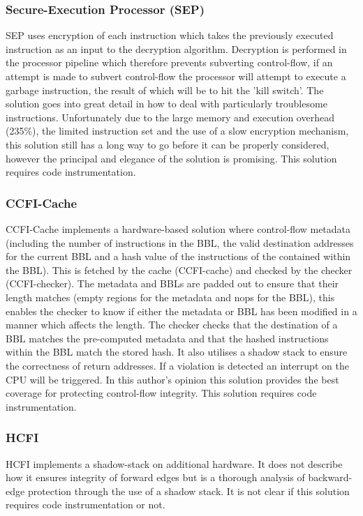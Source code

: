 \subsubsection{Secure-Execution Processor (SEP)}
SEP \cite{Lee2019} uses encryption of each instruction which takes the previously executed instruction as an input to the decryption algorithm. Decryption is performed in the processor pipeline which therefore prevents subverting control-flow, if an attempt is made to subvert control-flow the processor will attempt to execute a garbage instruction, the result of which will be to hit the 'kill switch'. The solution goes into great detail in how to deal with particularly troublesome instructions. Unfortunately due to the large memory and execution overhead (235\%), the limited instruction set and the use of a slow encryption mechanism, this solution still has a long way to go before it can be properly considered, however the principal and elegance of the solution is promising. This solution requires code instrumentation.

\subsubsection{CCFI-Cache}
CCFI-Cache \cite{Danger2018} implements a hardware-based solution where control-flow metadata (including the number of instructions in the BBL, the valid destination addresses for the current BBL and a hash value of the instructions of the contained within the BBL). This is fetched by the cache (CCFI-cache) and checked by the checker (CCFI-checker). The metadata and BBLs are padded out to ensure that their length matches (empty regions for the metadata and nops for the BBL), this enables the checker to know if either the metadata or BBL has been modified in a manner which affects the length. The checker checks that the destination of a BBL matches the pre-computed metadata and that the hashed instructions within the BBL match the stored hash. It also utilises a shadow stack to ensure the correctness of return addresses. If a violation is detected an interrupt on the CPU will be triggered. In this author's opinion this solution provides the best coverage for protecting control-flow integrity. This solution requires code instrumentation.

\subsubsection{HCFI}
HCFI \cite{Danger2018} implements a shadow-stack on additional hardware. It does not describe how it ensures integrity of forward edges but is a thorough analysis of backward-edge protection through the use of a shadow stack. It is not clear if this solution requires code instrumentation or not.

